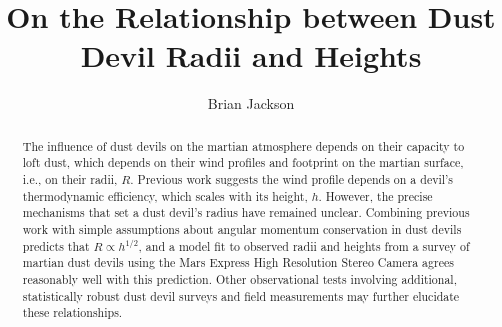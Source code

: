 \documentclass{aastex63}
\begin{document}
\title{On the Relationship between Dust Devil Radii and Heights}


\author[0000-0002-9495-9700]{Brian Jackson}



\begin{abstract}
The influence of dust devils on the martian atmosphere depends on their capacity to loft dust, which depends on their wind profiles and footprint on the martian surface, i.e., on their radii, $R$. Previous work suggests the wind profile depends on a devil's thermodynamic efficiency, which scales with its height, $h$. However, the precise mechanisms that set a dust devil's radius have remained unclear. Combining previous work with simple assumptions about angular momentum conservation in dust devils predicts that $R \propto h^{1/2}$, and a model fit to observed radii and heights from a survey of martian dust devils using the Mars Express High Resolution Stereo Camera agrees reasonably well with this prediction. Other observational tests involving additional, statistically robust dust devil surveys and field measurements may further elucidate these relationships.
\end{abstract}

\end{document}
